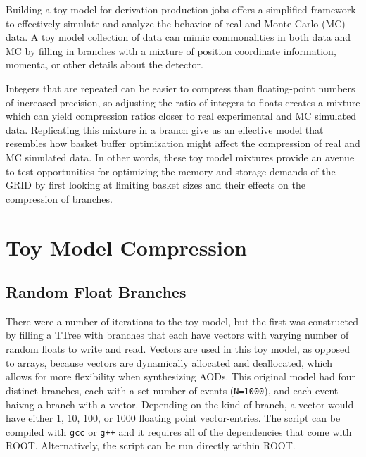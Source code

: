 Building a toy model for derivation production jobs offers a simplified framework to effectively simulate and analyze the behavior of real and Monte Carlo (MC) data.
A toy model collection of data can mimic commonalities in both data and MC by filling in branches with a mixture of position coordinate information, momenta, or other details about the detector.  

Integers that are repeated can be easier to compress than floating-point numbers of increased precision, so adjusting the ratio of integers to floats creates a mixture which can yield compression ratios closer to real experimental and MC simulated data.  
Replicating this mixture in a branch give us an effective model that resembles how basket buffer optimization might affect the compression of real and MC simulated data. 
In other words, these toy model mixtures provide an avenue to test opportunities for optimizing the memory and storage demands of the GRID by first looking at limiting basket sizes and their effects on the compression of branches. 

\section{Toy Model Compression}

\subsection{Random Float Branches} \label{sec:toy_compression_random_float_branches}
There were a number of iterations to the toy model, but the first was constructed by filling a TTree with branches that each have vectors with varying number of random floats to write and read.
Vectors are used in this toy model, as opposed to arrays, because vectors are dynamically allocated and deallocated, which allows for more flexibility when synthesizing AODs. 
This original model had four distinct branches, each with a set number of events (\verb|N=1000|), and each event haivng a branch with a vector. 
Depending on the kind of branch, a vector would have either 1, 10, 100, or 1000 floating point vector-entries.
The script can be compiled with \verb|gcc| or \verb|g++| and it requires all of the dependencies that come with ROOT. 
Alternatively, the script can be run directly within ROOT.

